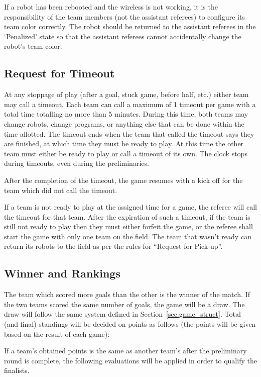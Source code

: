 \documentclass[12pt]{article}
\begin{document}
If a robot has been rebooted and the wireless is not working, it is
the responsibility of the team members (not the assistant referees)
to configure its team color correctly.  The robot should be returned
to the assistant referees in the `Penalized' state so that the
assistant referees cannot accidentally change the robot's team color.

\subsection{Request for Timeout}

At any stoppage of play (after a goal, stuck game, before half,
etc.) either team may call a timeout.  Each team can call a maximum
of 1 timeout per game with a total time totalling no more than 5
minutes.  During this time, both teams may change robots, change
programs, or anything else that can be done within the time
allotted.  The timeout ends when the team that called the timeout
says they are finished, at which time they must be ready to play. At
this time the other team must either be ready to play or call a
timeout of its own.  The clock stops during timeouts, even during
the preliminaries.

After the completion of the timeout, the game resumes with a kick
off for the team which did not call the timeout.

If a team is not ready to play at the assigned time for a game, the
referee will call the timeout for that team.  After the expiration
of such a timeout, if the team is still not ready to play then they
must either forfeit the game, or the referee shall start the game with
only one team on the field.  The team that wasn't ready can return
its robots to the field as per the rules for ``Request for Pick-up''.

\subsection{Winner and Rankings}
The team which scored more goals than the other is the winner of the
match. If the two teams scored the same number of goals, the game
will be a draw. The draw will follow the same system defined in
Section~\ref{sec:game_struct}. Total (and final) standings will be
decided on points as follows (the points will be given based on the
result of each game):


If a team's obtained points is the same as another team's after the
preliminary round is complete, the following evaluations will be
applied in order to qualify the finalists.
\end{document}
